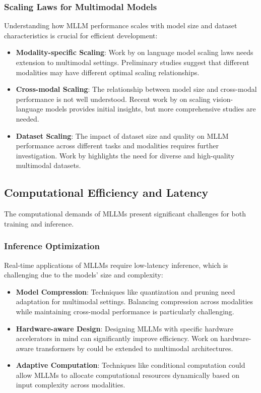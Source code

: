 \subsubsection{Scaling Laws for Multimodal Models}
Understanding how MLLM performance scales with model size and dataset characteristics is crucial for efficient development:

\begin{itemize}
    \item \textbf{Modality-specific Scaling}: Work by \citet{kaplan2020scaling} on language model scaling laws needs extension to multimodal settings. Preliminary studies suggest that different modalities may have different optimal scaling relationships.
    
    \item \textbf{Cross-modal Scaling}: The relationship between model size and cross-modal performance is not well understood. Recent work by \citet{zhai2022scaling} on scaling vision-language models provides initial insights, but more comprehensive studies are needed.
    
    \item \textbf{Dataset Scaling}: The impact of dataset size and quality on MLLM performance across different tasks and modalities requires further investigation. Work by \citet{bommasani2021opportunities} highlights the need for diverse and high-quality multimodal datasets.
\end{itemize}

\subsection{Computational Efficiency and Latency}
The computational demands of MLLMs present significant challenges for both training and inference.

\subsubsection{Inference Optimization}
Real-time applications of MLLMs require low-latency inference, which is challenging due to the models' size and complexity:

\begin{itemize}
    \item \textbf{Model Compression}: Techniques like quantization and pruning \citep{ganesh2021compressing} need adaptation for multimodal settings. Balancing compression across modalities while maintaining cross-modal performance is particularly challenging.
    
    \item \textbf{Hardware-aware Design}: Designing MLLMs with specific hardware accelerators in mind can significantly improve efficiency. Work on hardware-aware transformers by \citet{wang2021spatten} could be extended to multimodal architectures.
    
    \item \textbf{Adaptive Computation}: Techniques like conditional computation \citep{bengio2013estimating} could allow MLLMs to allocate computational resources dynamically based on input complexity across modalities.
\end{itemize}

